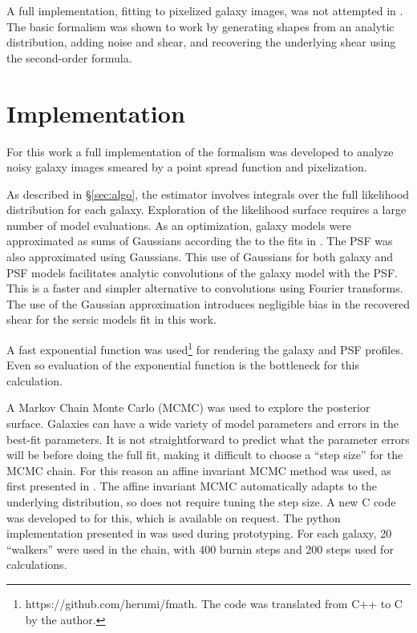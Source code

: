 \documentclass[12pt,preprint]{aastex}
\begin{document}
A full implementation, fitting to pixelized galaxy images, was not attempted in
\citet{ba13}.  The basic formalism was shown to work by generating shapes from
an analytic distribution, adding noise and shear, and recovering the underlying
shear using the second-order formula.

\section{Implementation} \label{sec:impl}

For this work a full implementation of the \citet{ba13} formalism was developed
to analyze noisy galaxy images smeared by a point spread function and 
pixelization.

As described in \S \ref{sec:algo}, the estimator involves integrals over the
full likelihood distribution for each galaxy.  Exploration of the likelihood
surface requires a large number of model evaluations.  As an optimization,
galaxy models were approximated as sums of Gaussians according the to the fits
in \citet{HoggGMix12}.  The PSF was also approximated using Gaussians.  This
use of Gaussians for both galaxy and PSF models facilitates analytic
convolutions of the galaxy model with the PSF.  This is a faster and simpler
alternative to convolutions using Fourier transforms. The use of the
Gaussian approximation introduces negligible bias in the recovered shear for
the sersic models fit in this work.

A fast exponential function was used\footnote{https://github.com/herumi/fmath.
The code was translated from C++ to C by the author.} for rendering the galaxy
and PSF profiles.  Even so evaluation of the exponential function is the
bottleneck for this calculation.

A Markov Chain Monte Carlo (MCMC) was used to explore the posterior surface.
Galaxies can have a wide variety of model parameters and errors in the best-fit
parameters.  It is not straightforward to predict what the parameter errors
will be before doing the full fit, making it difficult to choose a ``step
size'' for the MCMC chain.  For this reason an affine invariant MCMC method was
used, as first presented in \citet{GoodmanWeare10}.  The affine invariant MCMC
automatically adapts to the underlying distribution, so does not require tuning
the step size.  A new C code was developed to for this, which is available on
request. The python implementation presented in \citet{Mackey13} was used
during prototyping.  For each galaxy, 20 ``walkers'' were used in the chain,
with 400 burnin steps and 200 steps used for calculations.
\end{document}
